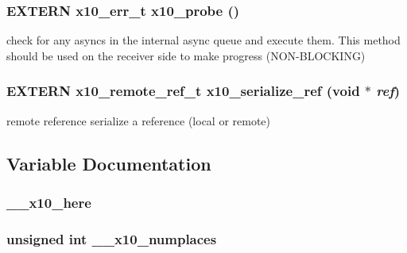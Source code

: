 \subsubsection{\setlength{\rightskip}{0pt plus 5cm}EXTERN {\bf x10\_\-err\_\-t} x10\_\-probe ()}\label{x10_8h_a6}


check for any asyncs in the internal async queue and execute them. This method should be used on the receiver side to make progress (NON-BLOCKING) 

\subsubsection{\setlength{\rightskip}{0pt plus 5cm}EXTERN {\bf x10\_\-remote\_\-ref\_\-t} x10\_\-serialize\_\-ref (void $\ast$ {\em ref})}\label{x10_8h_a18}


remote reference serialize a reference (local or remote) 



\subsection{Variable Documentation}
\subsubsection{ {\bf \_\-\_\-x10\_\-here}}\label{x10_8h_a0}


\subsubsection{\setlength{\rightskip}{0pt plus 5cm}unsigned int {\bf \_\-\_\-x10\_\-numplaces}}\label{x10_8h_a1}


